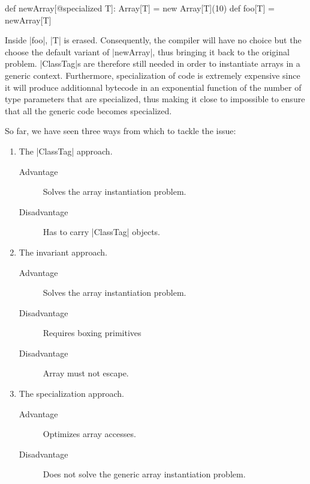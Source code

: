 \begin{lstlisting-nobreak}
 def newArray[@specialized T]: Array[T] = 
   new Array[T](10)
 def foo[T] = newArray[T]
\end{lstlisting-nobreak}

Inside |foo|, |T| is erased. Consequently, the compiler will have no choice but the choose the default variant of |newArray|, thus bringing it back to the original problem. |ClassTag|s are therefore still needed in order to instantiate arrays in a generic context. Furthermore, specialization of code is extremely expensive since it will produce additionnal bytecode in an exponential function of the number of type parameters that are specialized, thus making it close to impossible to ensure that all the generic code becomes specialized.


So far, we have seen three ways from which to tackle the issue:

\begin{enumerate}
  \item The |ClassTag| approach.
    \begin{description}
      \item[Advantage] 	Solves the array instantiation problem.
      \item[Disadvantage] Has to carry |ClassTag| objects.
    \end{description}
  \item The invariant approach.
    \begin{description}
      \item[Advantage] 	Solves the array instantiation problem.
      \item[Disadvantage] Requires boxing primitives
      \item[Disadvantage] Array must not escape.
    \end{description}
  \item The specialization approach.
    \begin{description}
      \item[Advantage] 	Optimizes array accesses.
      \item[Disadvantage] Does not solve the generic array instantiation problem.
    \end{description}
\end{enumerate}

